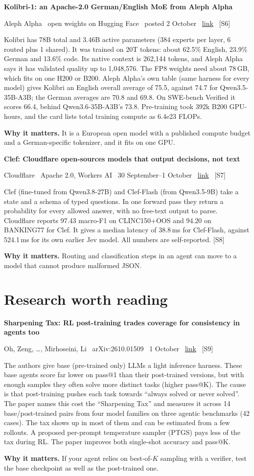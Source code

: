 \documentclass[11pt,a4paper]{article}
\newcommand{\entry}[4]{%
  \par\vspace{0.7em}%
  {\sffamily\bfseries\color{brandink}#1}\par
  {\footnotesize\color{brandgrey}#2 \textbullet\ \href{#3}{link} \textbullet\ \srcref{#4}}\par
  \vspace{0.15em}}
\newcommand{\why}[1]{\par{\small\textbf{Why it matters.} #1}\par}
\newcommand{\srcref}[1]{\textcolor{brandaccent}{[S#1]}}
\begin{document}
\entry{Kolibri-1: an Apache-2.0 German/English MoE from Aleph Alpha}{Aleph Alpha \textbullet\ open weights on Hugging Face \textbullet\ posted 2 October}{https://huggingface.co/Aleph-Alpha/Kolibri-1}{6}
Kolibri has 78B total and 3.46B active parameters (384 experts per layer, 6 routed plus 1 shared).
It was trained on 20T tokens: about 62.5\% English, 23.9\% German and 13.6\% code. Its native
context is 262,144 tokens, and Aleph Alpha says it has validated quality up to 1,048,576.
The FP8 weights need about 78\,GB, which fits on one H200 or B200. Aleph Alpha's own table
(same harness for every model) gives Kolibri an English overall average of 75.5, against
74.7 for Qwen3.5-35B-A3B; the German averages are 70.8 and 69.8. On SWE-bench Verified it
scores 66.4, behind Qwen3.6-35B-A3B's 73.8. Pre-training took 392k B200 GPU-hours, and the
card lists total training compute as 6.4e23 FLOPs.
\why{It is a European open model with a published compute budget and a German-specific tokenizer, and it fits on one GPU.}

\entry{Clef: Cloudflare open-sources models that output decisions, not text}{Cloudflare \textbullet\ Apache 2.0, Workers AI \textbullet\ 30 September--1 October}{https://huggingface.co/Cloudflare/clef}{7}
Clef (fine-tuned from Qwen3.8-27B) and Clef-Flash (from Qwen3.5-9B) take a state and a schema of
typed questions. In one forward pass they return a probability for every allowed answer, with
no free-text output to parse. Cloudflare reports 97.43 macro-F1 on CLINC150+OOS and
94.20 on BANKING77 for Clef. It gives a median latency of 38.8\,ms for Clef-Flash,
against 524.1\,ms for its own earlier Jev model. All numbers are self-reported. \srcref{8}
\why{Routing and classification steps in an agent can move to a model that cannot produce malformed JSON.}

\section{Research worth reading}

\entry{Sharpening Tax: RL post-training trades coverage for consistency in agents too}{Oh, Zeng, \ldots, Mirhoseini, Li \textbullet\ arXiv:2610.01509 \textbullet\ 1 October}{https://arxiv.org/abs/2610.01509}{9}
The authors give base (pre-trained only) LLMs a light inference harness. These base agents
score far lower on pass@1 than their post-trained versions, but with enough samples they
often solve more distinct tasks (higher pass@K). The cause is that post-training pushes each
task towards ``always solved or never solved''. The paper names this cost the ``Sharpening Tax''
and measures it across 14 base/post-trained pairs from four model families on three agentic
benchmarks (42 cases). The tax shows up in most of them and can be estimated from a few rollouts.
A proposed per-prompt temperature sampler (PTGS) pays less of the tax during RL.
The paper improves both single-shot accuracy and pass@K.
\why{If your agent relies on best-of-$K$ sampling with a verifier, test the base checkpoint as well as the post-trained one.}
\end{document}
